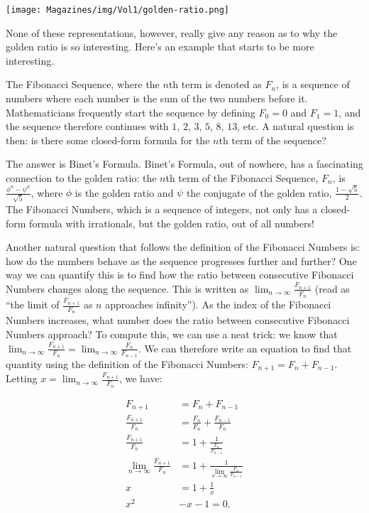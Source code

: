 \documentclass{article}
\begin{document}
\begin{multicols}{3}
{\begin{center}
    \texttt{[image: Magazines/img/Vol1/golden-ratio.png]}
\end{center}

None of these representations, however, really give any reason as to why the golden ratio is so interesting. Here’s an example that starts to be more interesting.

The Fibonacci Sequence, where the $n$th term is denoted as $F_n$, is a sequence of numbers where each number is the sum of the two numbers before it. Mathematicians frequently start the sequence by defining $F_0=0$ and $F_1=1$, and the sequence therefore continues with $1$, $2$, $3$, $5$, $8$, $13$, etc. A natural question is then: is there some closed-form formula for the $n$th term of the sequence?

The answer is Binet’s Formula. Binet’s Formula, out of nowhere, has a fascinating connection to the golden ratio: the $n$th term of the Fibonacci Sequence, $F_n$, is $\frac{\phi^n - \psi^n}{\sqrt5}$, where $\phi$ is the golden ratio and $\psi$ the conjugate of the golden ratio, $\frac{1-\sqrt{5}}{2}$. The Fibonacci Numbers, which is a sequence of integers, not only has a closed-form formula with irrationals, but the golden ratio, out of all numbers!

Another natural question that follows the definition of the Fibonacci Numbers is: how do the numbers behave as the sequence progresses further and further? One way we can quantify this is to find how the ratio between consecutive Fibonacci Numbers changes along the sequence. This is written as $\lim_{n\to\infty}\frac{F_{n+1}}{F_n}$ (read as ``the limit of $\frac{F_{n+1}}{F_n}$ as $n$ approaches infinity''). As the index of the Fibonacci Numbers increases, what number does the ratio between consecutive Fibonacci Numbers approach?
To compute this, we can use a neat trick: we know that $\lim_{n\to\infty}\frac{F_{n+1}}{F_n}=\lim_{n\to\infty}\frac{F_n}{F_{n-1}}$. We can therefore write an equation to find that quantity using the definition of the Fibonacci Numbers: $F_{n+1}=F_n+F_{n-1}$. Letting $x=\lim_{n\to\infty}\frac{F_{n+1}}{F_n}$, we have:

{\footnotesize\begin{align*}
    F_{n+1}&=F_n+F_{n-1}\\
    \frac{F_{n+1}}{F_n}&=\frac{F_n}{F_n}+\frac{F_{n-1}}{F_n}\\
    \frac{F_{n+1}}{F_n}&=1+\frac{1}{\frac{F_n}{F_{n-1}}}\\
    \lim_{n\rightarrow\infty} \frac{F_{n+1}}{F_n}&=1+\frac{1}{\lim_{n\rightarrow\infty} \frac{F_{n}}{F_{n-1}}}\\
    x&=1+\frac{1}{x}\\
    x^2&-x-1=0.
\end{align*}}


}
\end{multicols}
\end{document}
